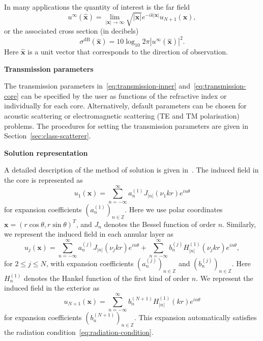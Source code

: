 \documentclass[11pt,letterpaper]{article}
\newcommand{\x}{\boldsymbol{x}}
\newcommand{\xh}{\widehat{\boldsymbol{x}}}
\newcommand{\bbZ}{\mathbb{Z}}
\newcommand{\ri}{\nu}
\newcommand{\techheading}[1]{%
    \par\vspace{-0.3\parskip}\noindent\hspace{-1cm}\textbf{#1}%
    \par\vspace{-0.5\parskip}\noindent\nopagebreak\ignorespaces}
\begin{document}
In many applications the quantity of interest is the far field
\begin{equation}
  \label{eq:far-field}
  u^\infty(\xh) = \lim_{|\x|\to \infty} \sqrt{|\x|} e^{-ik|\x|} u_{N+1}(\x),
\end{equation}
or the associated cross section (in decibels)
\begin{equation}
  \label{eq:rcs}
  \sigma^{\mathrm{dB}}(\xh) = 10 \log_{10} 2 \pi |u^\infty(\xh)|^2.
\end{equation}
Here $\xh$ is a unit vector that corresponds to the direction of
observation.

\techheading{Transmission parameters}
The transmission parameters
in~\eqref{eq:transmission-inner}
and~\eqref{eq:transmission-core} can be specified by the user
as functions of the refractive index or individually for each core.
Alternatively, default parameters can be chosen
for acoustic scattering or
electromagnetic scattering (TE and TM polarisation) problems.
The procedures for setting the transmission parameters are
given in Section~\ref{sec:class-scatterer}.

\techheading{Solution representation}
A detailed description of the method of solution is given in~\cite{mietoms}.
The induced field in the
core is represented as
\begin{equation}
  \label{eq:expansion-core}
  u_1(\x) = \sum_{n=-\infty}^\infty a^{(1)}_n J_{|n|}(\ri_1 k r) e^{i n \theta}
\end{equation}
for expansion coefficients $(a^{(1)}_n)_{n \in \bbZ}$.
Here we use polar coordinates $\x = 
(r \cos \theta,r \sin \theta)^T$,
and $J_n$ denotes the Bessel function of order $n$.
Similarly, we represent the induced field in each annular layer as
\begin{equation}
  \label{eq:expansion-layers}
  u_j(\x) = \sum_{n=-\infty}^\infty a^{(j)}_n J_{|n|}(\ri_j k r) e^{i n \theta}
  + \sum_{n=-\infty}^\infty b^{(j)}_n H^{(1)}_{|n|}(\ri_j k r) e^{i n \theta},
\end{equation}
for $2 \leq j \leq N$,
with expansion coefficients $(a^{(j)}_n)_{n \in \bbZ}$
and $(b^{(j)}_n)_{n \in \bbZ}$.
Here $H_n^{(1)}$ denotes the Hankel function of the first kind of order $n$.
We represent the induced field in the exterior as
\begin{equation}
  \label{eq:expansion-exterior}
  u_{N+1}(\x) = 
  \sum_{n=-\infty}^\infty b^{(N+1)}_n H^{(1)}_{|n|}(k r) e^{i n \theta}
\end{equation}
for expansion coefficients
$(b^{(N+1)}_n)_{n \in \bbZ}$.
This expansion automatically satisfies the radiation 
condition~\eqref{eq:radiation-condition}.
\end{document}
